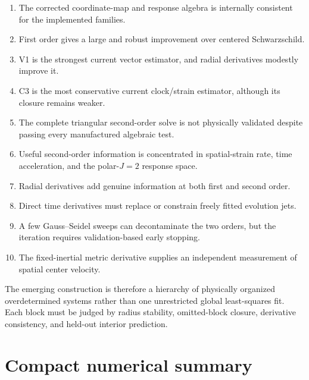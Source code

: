 \documentclass[11pt]{article}
\begin{document}
\begin{enumerate}
  \item The corrected coordinate-map and response algebra is internally
        consistent for the implemented families.
  \item First order gives a large and robust improvement over centered
        Schwarzschild.
  \item V1 is the strongest current vector estimator, and radial derivatives
        modestly improve it.
  \item C3 is the most conservative current clock/strain estimator, although
        its closure remains weaker.
  \item The complete triangular second-order solve is not physically
        validated despite passing every manufactured algebraic test.
  \item Useful second-order information is concentrated in spatial-strain
        rate, time acceleration, and the polar-\(J=2\) response space.
  \item Radial derivatives add genuine information at both first and second
        order.
  \item Direct time derivatives must replace or constrain freely fitted
        evolution jets.
  \item A few Gauss--Seidel sweeps can decontaminate the two orders, but the
        iteration requires validation-based early stopping.
  \item The fixed-inertial metric derivative supplies an independent
        measurement of spatial center velocity.
\end{enumerate}

The emerging construction is therefore a hierarchy of physically organized
overdetermined systems rather than one unrestricted global least-squares fit.
Each block must be judged by radius stability, omitted-block closure,
derivative consistency, and held-out interior prediction.

\appendix
\section{Compact numerical summary}
\end{document}
